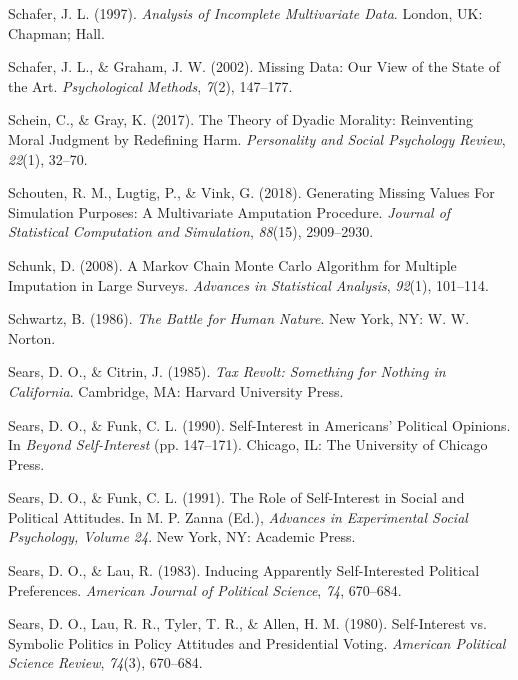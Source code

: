 \documentclass[12pt,econ]{sources/authesis}
\begin{document}
\leavevmode\hypertarget{ref-schafer_1997_analysis}{}%
Schafer, J. L. (1997). \emph{Analysis of Incomplete Multivariate Data}. London, UK: Chapman; Hall.

\leavevmode\hypertarget{ref-schafer_2002_missing}{}%
Schafer, J. L., \& Graham, J. W. (2002). Missing Data: Our View of the State of the Art. \emph{Psychological Methods}, \emph{7}(2), 147--177.

\leavevmode\hypertarget{ref-schein_2017_theory}{}%
Schein, C., \& Gray, K. (2017). The Theory of Dyadic Morality: Reinventing Moral Judgment by Redefining Harm. \emph{Personality and Social Psychology Review}, \emph{22}(1), 32--70.

\leavevmode\hypertarget{ref-schouten_2018_generating}{}%
Schouten, R. M., Lugtig, P., \& Vink, G. (2018). Generating Missing Values For Simulation Purposes: A Multivariate Amputation Procedure. \emph{Journal of Statistical Computation and Simulation}, \emph{88}(15), 2909--2930.

\leavevmode\hypertarget{ref-schunk_2008_markov}{}%
Schunk, D. (2008). A Markov Chain Monte Carlo Algorithm for Multiple Imputation in Large Surveys. \emph{Advances in Statistical Analysis}, \emph{92}(1), 101--114.

\leavevmode\hypertarget{ref-schwartz_battle_1986}{}%
Schwartz, B. (1986). \emph{The Battle for Human Nature}. New York, NY: W. W. Norton.

\leavevmode\hypertarget{ref-sears_tax_1985}{}%
Sears, D. O., \& Citrin, J. (1985). \emph{Tax Revolt: Something for Nothing in California}. Cambridge, MA: Harvard University Press.

\leavevmode\hypertarget{ref-sears_self-interest_1990}{}%
Sears, D. O., \& Funk, C. L. (1990). Self-Interest in Americans' Political Opinions. In \emph{Beyond Self-Interest} (pp. 147--171). Chicago, IL: The University of Chicago Press.

\leavevmode\hypertarget{ref-sears_role_1991}{}%
Sears, D. O., \& Funk, C. L. (1991). The Role of Self-Interest in Social and Political Attitudes. In M. P. Zanna (Ed.), \emph{Advances in Experimental Social Psychology, Volume 24}. New York, NY: Academic Press.

\leavevmode\hypertarget{ref-sears_inducing_1983}{}%
Sears, D. O., \& Lau, R. (1983). Inducing Apparently Self-Interested Political Preferences. \emph{American Journal of Political Science}, \emph{74}, 670--684.

\leavevmode\hypertarget{ref-sears_self-interest_1980}{}%
Sears, D. O., Lau, R. R., Tyler, T. R., \& Allen, H. M. (1980). Self-Interest vs. Symbolic Politics in Policy Attitudes and Presidential Voting. \emph{American Political Science Review}, \emph{74}(3), 670--684.
\end{document}
